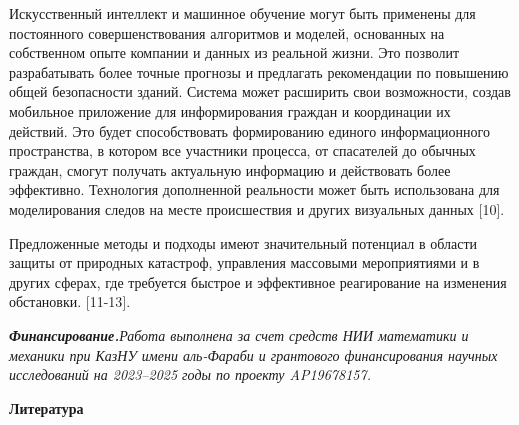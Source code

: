 \begin{multicols}{2}
Искусственный интеллект и машинное обучение могут быть применены для
постоянного совершенствования алгоритмов и моделей, основанных на
собственном опыте компании и данных из реальной жизни. Это позволит
разрабатывать более точные прогнозы и предлагать рекомендации по
повышению общей безопасности зданий. Система может расширить свои
возможности, создав мобильное приложение для информирования граждан и
координации их действий. Это будет способствовать формированию единого
информационного пространства, в котором все участники процесса, от
спасателей до обычных граждан, смогут получать актуальную информацию и
действовать более эффективно. Технология дополненной реальности может
быть использована для моделирования следов на месте происшествия и
других визуальных данных {[}10{]}.

Предложенные методы и подходы имеют значительный потенциал в области
защиты от природных катастроф, управления массовыми мероприятиями и в
других сферах, где требуется быстрое и эффективное реагирование на
изменения обстановки. {[}11-13{]}.

\emph{{\bfseries Финансирование.}Работа выполнена за счет средств НИИ
математики и механики при КазНУ имени аль-Фараби и грантового
финансирования научных исследований на 2023--2025 годы по проекту
AP19678157.}
\end{multicols}

\begin{center}
{\bfseries Литература}
\end{center}

